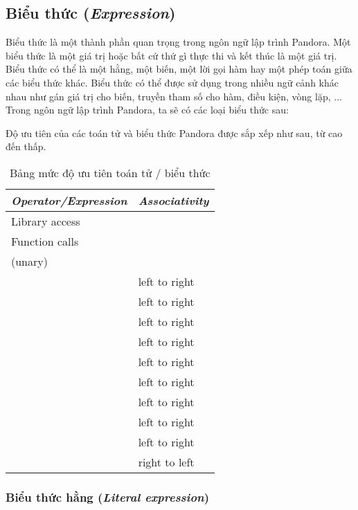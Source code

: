 \subsection{Biểu thức (\textit{Expression})}
\label{ch2:expr}

Biểu thức là một thành phần quan trọng trong ngôn ngữ lập trình Pandora. Một biểu thức là một giá trị hoặc bất cứ thứ gì thực thi và kết thúc là một giá trị. Biểu thức có thể là một hằng, một biến, một lời gọi hàm hay một phép toán giữa các biểu thức khác. Biểu thức có thể được sử dụng trong nhiều ngữ cảnh khác nhau như gán giá trị cho biến, truyền tham số cho hàm, điều kiện, vòng lặp, ... Trong ngôn ngữ lập trình Pandora, ta sẽ có các loại biểu thức sau:

\regexexpr

Độ ưu tiên của các toán tử và biểu thức Pandora được sắp xếp như sau, từ cao đến thấp. 

\begin{longtable}{| l | l |}
    \caption{Bảng mức độ ưu tiên toán tử / biểu thức} \\
\hline
\textbf{\textit{Operator/Expression}} & \textbf{\textit{Associativity}} \\
\hline
Library access & \\
\hline
Function calls & \\
\hline
\w{$!$} \w{$-$} (unary) & \\
\hline
\w{$*$} \w{$/$} \w{$\%$} & left to right \\
\hline
\w{$+$} \w{$-$} & left to right \\
\hline
\w{$<<$} \w{$>>$} & left to right \\
\hline
\w{$\&$} & left to right \\
\hline
\w{$\wedge$} & left to right \\
\hline
\w{$|$} & left to right \\
\hline
\w{$==$} \w{$!=$} \w{$<$} \w{$>$} \w{$<=$} \w{$>=$} & left to right \\
\hline
\w{$\&\&$} & left to right \\
\hline
\w{$|\,|$} & left to right \\
\hline
\w{$=$} \w{$+=$} \w{$-=$} \w{$*=$} \w{$/=$} \w{$\%=$} \w{$<<=$} \w{$>>=$} \w{$\&=$} \w{$\wedge=$} \w{$|=$} & right to left \\
\hline
\end{longtable}

\subsubsection{Biểu thức hằng (\textit{Literal expression})}

